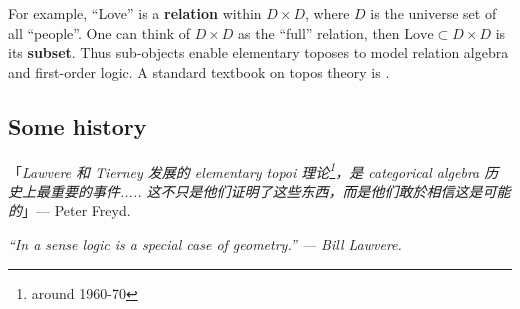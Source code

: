 \documentclass[12pt, orivec]{article}
\newcommand{\cc}[2]{#1}
\newcommand{\cc}[2]{#2}
\begin{document}
For example, ``Love'' is a \textbf{relation} within $D \times D$, where $D$ is the universe set of all ``people''.  One can think of $D \times D$ as the ``full'' relation, then $\mbox{Love} \subset D \times D$ is its \textbf{subset}.  Thus sub-objects enable elementary toposes to model relation algebra and first-order logic.  A standard textbook on topos theory is \parencite{Goldblatt1984}.

\subsection{Some history}

\cc{「\textit{Lawvere 和 Tierney 发展的 elementary topoi 理论\footnote{around 1960-70}，是 categorical algebra 历史上最重要的事件.....  这不只是他们证明了这些东西，而是他们敢於相信这是可能的}」--- Peter Freyd.
}{
\textit{``The development of elementary topoi by Lawvere and Tierney [around 1960-70] strikes this writer as the most important event in the history of categorical algebra since its creation..... It is not just that they proved these things, but that they dared to believe them provable.'' --- Peter Freyd.}}

\textit{``In a sense logic is a special case of geometry.'' --- Bill Lawvere.}
\end{document}
